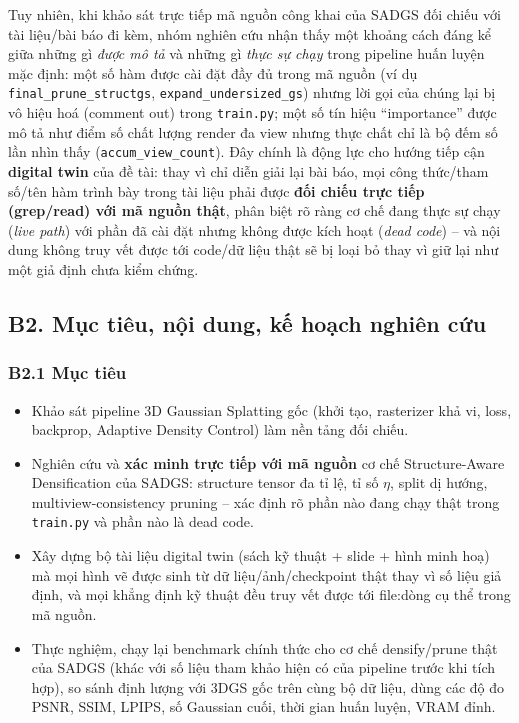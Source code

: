 \documentclass[a4paper,12pt]{article}
\begin{document}
Tuy nhiên, khi khảo sát trực tiếp mã nguồn công khai của SADGS đối chiếu với tài liệu/bài báo đi
kèm, nhóm nghiên cứu nhận thấy một khoảng cách đáng kể giữa những gì \emph{được mô tả} và những
gì \emph{thực sự chạy} trong pipeline huấn luyện mặc định: một số hàm được cài đặt đầy đủ trong
mã nguồn (ví dụ \texttt{final\_prune\_structgs}, \texttt{expand\_undersized\_gs}) nhưng lời gọi
của chúng lại bị vô hiệu hoá (comment out) trong \texttt{train.py}; một số tín hiệu ``importance''
được mô tả như điểm số chất lượng render đa view nhưng thực chất chỉ là bộ đếm số lần nhìn thấy
(\texttt{accum\_view\_count}). Đây chính là động lực cho hướng tiếp cận \textbf{digital twin}
của đề tài: thay vì chỉ diễn giải lại bài báo, mọi công thức/tham số/tên hàm trình bày trong tài
liệu phải được \textbf{đối chiếu trực tiếp (grep/read) với mã nguồn thật}, phân biệt rõ ràng cơ
chế đang thực sự chạy (\emph{live path}) với phần đã cài đặt nhưng không được kích hoạt
(\emph{dead code}) -- và nội dung không truy vết được tới code/dữ liệu thật sẽ bị loại bỏ thay vì
giữ lại như một giả định chưa kiểm chứng.

\subsection*{B2. Mục tiêu, nội dung, kế hoạch nghiên cứu}

\subsubsection*{B2.1 Mục tiêu}
\begin{itemize}[leftmargin=1.2em]
\item Khảo sát pipeline 3D Gaussian Splatting gốc (khởi tạo, rasterizer khả vi, loss, backprop,
Adaptive Density Control) làm nền tảng đối chiếu.
\item Nghiên cứu và \textbf{xác minh trực tiếp với mã nguồn} cơ chế Structure-Aware Densification
của SADGS: structure tensor đa tỉ lệ, tỉ số $\eta$, split dị hướng, multiview-consistency pruning
-- xác định rõ phần nào đang chạy thật trong \texttt{train.py} và phần nào là dead code.
\item Xây dựng bộ tài liệu digital twin (sách kỹ thuật + slide + hình minh hoạ) mà mọi hình vẽ
được sinh từ dữ liệu/ảnh/checkpoint thật thay vì số liệu giả định, và mọi khẳng định kỹ thuật đều
truy vết được tới file:dòng cụ thể trong mã nguồn.
\item Thực nghiệm, chạy lại benchmark chính thức cho cơ chế densify/prune thật của SADGS (khác
với số liệu tham khảo hiện có của pipeline trước khi tích hợp), so sánh định lượng với 3DGS gốc
trên cùng bộ dữ liệu, dùng các độ đo PSNR, SSIM, LPIPS, số Gaussian cuối, thời gian huấn luyện,
VRAM đỉnh.
\end{itemize}
\end{document}
